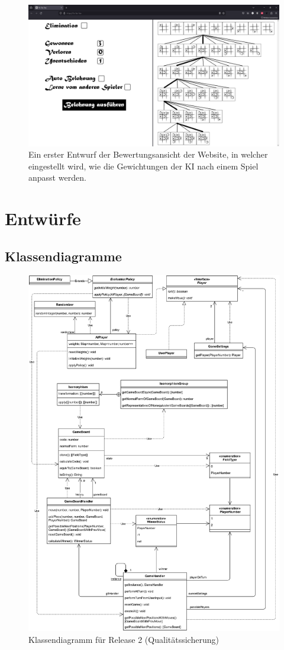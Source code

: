 \documentclass[titlepage]{scrartcl}
\begin{document}
\begin{figure}[ht]
\includegraphics[width=\textwidth]{tictactoe_bewertungsansicht.png}
\caption{Ein erster Entwurf der Bewertungsansicht der Website, in welcher eingestellt wird, wie die Gewichtungen der KI nach einem Spiel anpasst werden.}
\end{figure}

\FloatBarrier
\section{Entwürfe}
\subsection{Klassendiagramme}
\begin{figure}[ht]
\includegraphics[width=.7\textwidth]{Klassendiagramme/Aktuell.png}
\caption{Klassendiagramm für Release 2 (Qualitätssicherung)}
\end{figure}
\end{document}
